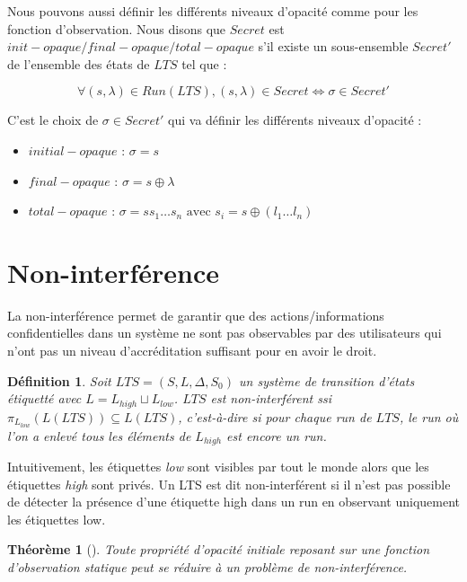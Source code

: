 \documentclass[10pt,a4paper]{article}
\newtheorem{mydef}{D\'efinition}
\newtheorem{myth}{Th\'eor\`eme}
\begin{document}
Nous pouvons aussi d\'efinir les diff\'erents niveaux d'opacit\'e comme pour les fonction d'observation. Nous disons que $Secret$ est $init-opaque/final-opaque/total-opaque$ s'il existe un sous-ensemble  $Secret'$ de l'ensemble des \'etats de $LTS$ tel que :

$$\forall (s,\lambda) \in Run(LTS), (s, \lambda) \in Secret \Leftrightarrow \sigma \in Secret'$$


C'est le choix de $\sigma\in Secret'$ qui va d\'efinir les diff\'erents niveaux d'opacit\'e :

\begin{itemize}
	\item $initial-opaque$ : $\sigma = s$
	\item $final-opaque$ : $\sigma = s\oplus \lambda$
	\item $total-opaque$ : $\sigma = s s_1 \dots s_n \mbox{ avec } s_i = s\oplus(l_1\dots l_n)$
\end{itemize} 

\section{Non-interf\'erence}

La non-interférence permet de garantir que des actions/informations  confidentielles dans un système ne sont pas observables par des utilisateurs qui n'ont pas un niveau d'accréditation suffisant pour en avoir le droit. 

\begin{mydef}
  Soit $LTS = (S,L,\Delta,S_0)$ un syst\`eme de transition d'\'etats \'etiquett\'e avec $L=L_{high}\sqcup L_{low}$. $LTS$ est non-interf\'erent ssi $\pi_{L_{low}}(L(LTS)) \subseteq L(LTS)$, c'est-\`a-dire si pour chaque run de $LTS$, le run o\`u l'on a enlev\'e tous les \'el\'ements de $L_{high}$ est encore un run.
\end{mydef}

Intuitivement, les étiquettes \emph{low} sont visibles par tout le monde alors que les étiquettes \emph{high} sont priv\'es. Un LTS est dit non-interf\'erent si il n'est pas possible de d\'etecter la pr\'esence d'une étiquette high dans un run en observant uniquement les étiquettes low.~\cite{GorrieriV10}

\begin{myth}[]
  Toute propri\'et\'e d'opacit\'e initiale reposant sur une fonction d'observation statique peut se r\'eduire \`a un probl\`eme  de non-interf\'erence.
  \label{opacity2noninterf}
\end{myth}
\end{document}
